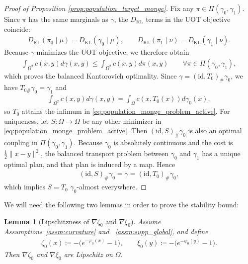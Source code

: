 \documentclass[11pt,reqno]{amsart}
\newtheorem{lemma}[theorem]{Lemma}
\theoremstyle{definition}
\newcommand{\KL}{\mathrm{KL}}
\begin{document}
\begin{proof}[Proof of Proposition \ref{prop:population_target_monge}]
Fix any $\pi \in \Pi(\gamma_0,\gamma_1)$. {Since $\pi$ has the same marginals as $\gamma$, the $D_\KL$ terms in the UOT objective coincide:}
\begin{align}
    {D_\KL}(\pi_0\mid \mu) = {D_\KL}(\gamma_0\mid \mu),
    \qquad
    {D_\KL}(\pi_1\mid \nu) = {D_\KL}(\gamma_1\mid \nu).
\end{align}
Because $\gamma$ minimizes the UOT objective, we therefore obtain
\begin{align}
    \int_{\Omega^2} c(x,y)   d\gamma(x,y)
    \le
    \int_{\Omega^2} c(x,y)   d\pi(x,y)
    \qquad
    \forall \pi \in \Pi(\gamma_0,\gamma_1),
\end{align}
which proves the balanced Kantorovich optimality. Since $\gamma=(\mathrm{id},T_0)_\#\gamma_0$, we have $T_{0\#}\gamma_0=\gamma_1$ and
\begin{align}
    \int_{\Omega^2} c(x,y)   d\gamma(x,y)
    =
    \int_\Omega c(x,T_0(x))   d\gamma_0(x),
\end{align}
so $T_0$ attains the infimum in \eqref{eq:population_monge_problem_active}.
For uniqueness, let $S:\Omega\to\Omega$ be any other minimizer in \eqref{eq:population_monge_problem_active}.
Then $(\mathrm{id},S)_\#\gamma_0$ is also an optimal coupling in $\Pi(\gamma_0,\gamma_1)$.
Because $\gamma_0$ is absolutely continuous and the cost is $\tfrac{1}{2}\|x-y\|^2$, the balanced transport problem between $\gamma_0$ and $\gamma_1$ has a unique optimal plan, and that plan is induced by a map.
Hence
\begin{align*}
    (\mathrm{id},S)_\#\gamma_0
    =
    \gamma
    =
    (\mathrm{id},T_0)_\#\gamma_0,
\end{align*}
which implies $S=T_0$ $\gamma_0$-almost everywhere.
\end{proof}



We will need the following two lemmas in order to prove the stability bound:
\begin{lemma}[Lipschitzness of $\nabla\zeta_0$ and $\nabla\xi_0$]
\label{lem:smoothness_effective}
Assume Assumptions~\ref{assm:curvature} and ~\ref{assm:supp_global}, and define
\begin{align*}
    \zeta_0(x) \coloneqq -\bigl(e^{-\varphi_0(x)}-1\bigr),
    \qquad
    \xi_0(y) \coloneqq -\bigl(e^{-\psi_0(y)}-1\bigr).
\end{align*}
Then $\nabla \zeta_0$ and $\nabla \xi_0$ are Lipschitz on $\Omega$.
\end{lemma}
\end{document}
